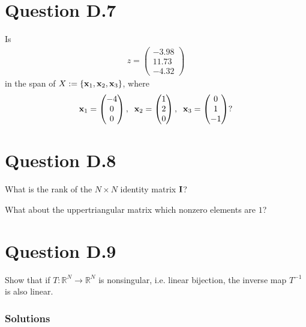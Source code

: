 \documentclass[letterpaper,10pt,english]{jupyterBook}
\begin{document}
\section{Question D.7}
\label{\detokenize{05.exercises.D:question-d-7}}
\sphinxAtStartPar
Is
\begin{equation*}
\begin{split}
z=
\begin{pmatrix}
-3.98 \\
11.73 \\
-4.32
\end{pmatrix}
\end{split}
\end{equation*}
\sphinxAtStartPar
in the span of \(X:=\{{\bf x}_1, {\bf x}_2, {\bf x}_3\}\), where
\begin{equation*}
\begin{split}
{\bf x}_1=
\begin{pmatrix}
-4 \\
0 \\
0
\end{pmatrix},
\;\;
{\bf x}_2=
\begin{pmatrix}
1 \\
2 \\
0
\end{pmatrix},
\;\;
{\bf x}_3=
\begin{pmatrix}
0 \\
1 \\
-1
\end{pmatrix}?
\end{split}
\end{equation*}

\section{Question D.8}
\label{\detokenize{05.exercises.D:question-d-8}}
\sphinxAtStartPar
What is the rank of the \(N \times N\) identity matrix \({\bf I}\)?

\sphinxAtStartPar
What about the upper\sphinxhyphen{}triangular matrix which non\sphinxhyphen{}zero elements are \(1\)?


\section{Question D.9}
\label{\detokenize{05.exercises.D:question-d-9}}
\sphinxAtStartPar
Show that if \(T: \mathbb{R}^N \to \mathbb{R}^N\) is nonsingular, i.e. linear bijection, the inverse map \(T^{-1}\) is also linear.
\subsubsection*{Solutions}
\end{document}
